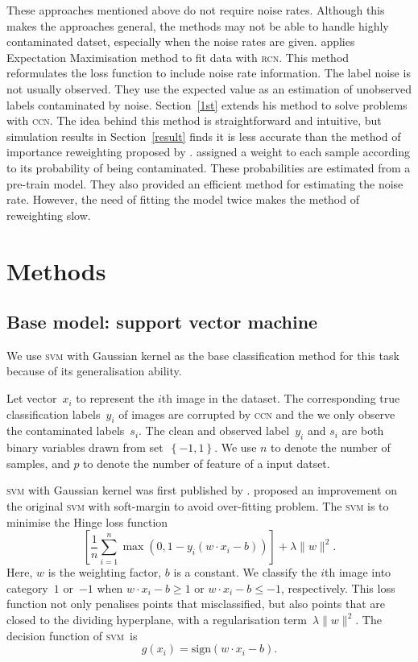 \documentclass[12pt]{article} %
\newcommand{\svm}{\textsc{svm}}
\begin{document}
These approaches mentioned above do not require noise rates. Although this makes the approaches general, the methods may not be able to handle highly contaminated datset, especially when the noise rates are given. \citet{pmlr-v20-biggio11} applies Expectation Maximisation method to fit data with \textsc{rcn}. This method reformulates the loss function to include noise rate information. The label noise is not usually observed. They use the expected value as an estimation of unobserved labels contaminated by noise. Section~\ref{1st} extends his method to solve problems with \textsc{ccn}. The idea behind this method is straightforward and intuitive, but  simulation results in Section~\ref{result} finds it is less accurate than the method of importance reweighting proposed by \citet{liu2016classification}. \citet{liu2016classification} assigned a weight to each sample according to its probability of being contaminated. These probabilities are estimated from a pre-train model. They also provided an efficient method for estimating the noise rate. However, the need of fitting the model twice makes the method of reweighting slow.

\section{Methods}\label{method}


\subsection{Base model: support vector machine}\label{sec:over}
We use \textsc{svm} with Gaussian kernel as the base classification method for this task because of its generalisation ability.

Let vector~$x_i$ to represent the $i$th image in the dataset. The corresponding true classification labels~$y_i$ of images are corrupted by \textsc{ccn} and the we only observe the contaminated labels~$s_i$. The clean and observed label~$y_i$ and $s_i$ are both binary variables drawn from set~$\left\{-1,1\right\}$. We use $n$ to denote the number of samples, and $p$ to denote the number of feature of a input datset.

\textsc{svm} with Gaussian kernel was first published by \citet{Boser:1992:TAO:130385.130401}.
\citet{Cortes1995} proposed an improvement on the original \textsc{svm} with soft-margin  to  avoid over-fitting problem. The \textsc{svm} is to minimise the Hinge loss function
\begin{equation*}
\left[{\frac {1}{n}}\sum _{i=1}^{n}\max \left(0,1-y_{i}(w\cdot x_{i}-b)\right)\right]+\lambda \lVert w\rVert ^{2}.
\end{equation*}
Here, $w$ is the weighting factor, $b$ is a constant. We classify the $i$th image into category~$1$ or~$-1$ when $w\cdot x_{i}-b\geq1$ or $w\cdot x_{i}-b\leq-1$, respectively. This loss function not only penalises points that misclassified, but also points that are closed to the dividing hyperplane, with a regularisation term~$\lambda \lVert w\rVert ^{2}$. The decision function of \svm\ is
\begin{equation}\label{eq:decision}
 g(x_{i})=\text{sign}(w\cdot x_{i}-b).
\end{equation}
\end{document}
